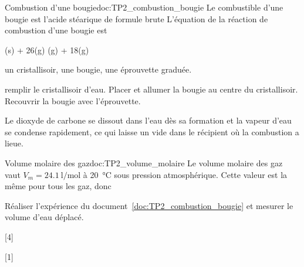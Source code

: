 \begin{doc}{Combustion d'une bougie}{doc:TP2_combustion_bougie}
  Le combustible d'une bougie est l'acide stéarique de formule brute 
  L'équation de la réaction de combustion d'une bougie est
  \begin{center}
    (s) + 26(g) (g) + 18(g)
  \end{center}

   un cristallisoir, une bougie, une éprouvette graduée.

   remplir le cristallisoir d'eau.
  Placer et allumer la bougie au centre du cristallisoir.
  Recouvrir la bougie avec l'éprouvette.

  Le dioxyde de carbone se dissout dans l'eau dès sa formation et la vapeur d'eau se condense rapidement, ce qui laisse un vide dans le récipient où la combustion a lieue.
\end{doc}

\begin{doc}{Volume molaire des gaz}{doc:TP2_volume_molaire}
  Le volume molaire des gaz vaut $V_m = \qty{24,1}{\litre\per\mole}$ à \qty{20}{\degreeCelsius} sous pression atmosphérique.
  Cette valeur est la même pour tous les gaz, donc 
\end{doc}

\mesure Réaliser l'expérience du document~\ref{doc:TP2_combustion_bougie} et mesurer le volume d'eau déplacé.

[4]

[1]